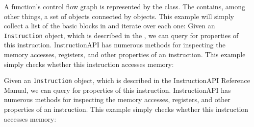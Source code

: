 A function’s control flow graph is represented by the \BPatchflowGraph class.  The \BPatchflowGraph contains, among other things, a set of \BPatchbasicBlock objects connected by \BPatchedge objects.  This example will simply collect a list of the basic blocks in \BPatchflowGraph and iterate over each one:
\newcommand{\Instruction}[0]{\texttt{Instruction}\xspace}
Given an \Instruction object, which is described in the \InstructionAPIReferenceManual, we can query for properties of this instruction.  InstructionAPI has numerous methods for inspecting the memory accesses, registers, and other properties of an instruction.  This example simply checks whether this instruction accesses memory:

Given an \Instruction object, which is described in the InstructionAPI Reference Manual, we can query for properties of this instruction.  InstructionAPI has numerous methods for inspecting the memory accesses, registers, and other properties of an instruction.  This example simply checks whether this instruction accesses memory:

